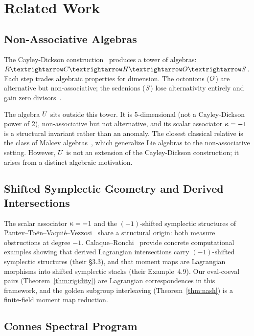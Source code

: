 \section*{Related Work}

\subsection*{Non-Associative Algebras}

The Cayley-Dickson construction~\cite{schafer} produces a tower of algebras: $\RR \to \CC \to \HH \to \OO \to \SS$. Each step trades algebraic properties for dimension. The octonions ($O$) are alternative but non-associative; the sedenions ($S$) lose alternativity entirely and gain zero divisors~\cite{baez-octonions}.

The algebra $U$ sits outside this tower. It is 5-dimensional (not a Cayley-Dickson power of 2), non-associative but not alternative, and its scalar associator $\kappa = -1$ is a structural invariant rather than an anomaly. The closest classical relative is the class of Malcev algebras~\cite{malcev}, which generalize Lie algebras to the non-associative setting. However, $U$ is not an extension of the Cayley-Dickson construction; it arises from a distinct algebraic motivation.

\subsection*{Shifted Symplectic Geometry and Derived Intersections}

The scalar associator $\kappa = -1$ and the $(-1)$-shifted symplectic structures of Pantev--To\"en--Vaqui\'e--Vezzosi~\cite{ptvv} share a structural origin: both measure obstructions at degree $-1$. Calaque--Ronchi~\cite{calaque-ronchi} provide concrete computational examples showing that derived Lagrangian intersections carry $(-1)$-shifted symplectic structures (their \S3.3), and that moment maps are Lagrangian morphisms into shifted symplectic stacks (their Example~4.9). Our eval-coeval pairs (Theorem~\ref{thm:rigidity}) are Lagrangian correspondences in this framework, and the golden subgroup interleaving (Theorem~\ref{thm:nash}) is a finite-field moment map reduction.

\subsection*{Connes Spectral Program}

